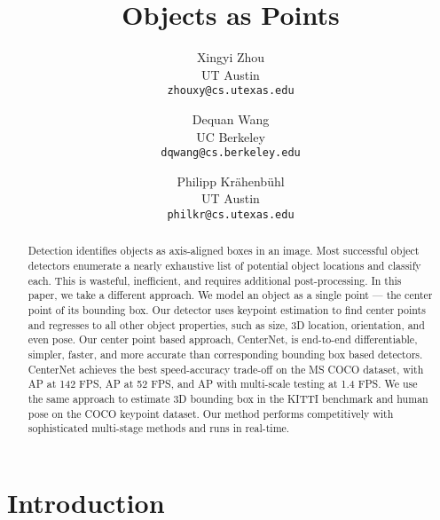 \documentclass[10pt,twocolumn,letterpaper]{article}
\begin{document}
\title{Objects as Points}

\author{Xingyi Zhou\\
UT Austin\\
{\tt\small zhouxy@cs.utexas.edu}
\and
Dequan Wang\\
UC Berkeley\\
{\tt\small dqwang@cs.berkeley.edu}
\and
Philipp Kr\"ahenb\"uhl\\
UT Austin\\
{\tt\small philkr@cs.utexas.edu}
}

\maketitle



\begin{abstract}
Detection identifies objects as axis-aligned boxes in an image.
Most successful object detectors enumerate a nearly exhaustive list of potential object locations and classify each.
This is wasteful, inefficient, and requires additional post-processing.
In this paper, we take a different approach.
We model an object as a single point --- the center point of its bounding box.
Our detector uses keypoint estimation to find center points and regresses to all other object properties, such as size, 3D location, orientation, and even pose.
Our center point based approach, CenterNet, is end-to-end differentiable, simpler, faster, and more accurate than corresponding bounding box based detectors.
CenterNet achieves the best speed-accuracy trade-off on the MS COCO dataset, with  AP at 142 FPS,  AP at 52 FPS, and  AP with multi-scale testing at 1.4 FPS.
We use the same approach to estimate 3D bounding box in the KITTI benchmark and human pose on the COCO keypoint dataset.
Our method performs competitively with sophisticated multi-stage methods and runs in real-time.

\end{abstract}

\section{Introduction}
\end{document}
